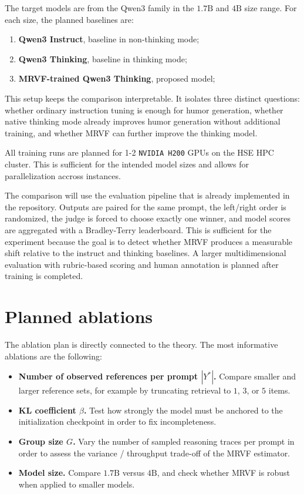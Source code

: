 The target models are from the Qwen3 family in the \(1.7\text{B}\) and \(4\text{B}\) size range. For each size, the planned baselines are:
\begin{enumerate}[leftmargin=1.8em]
    \item \textbf{Qwen3 Instruct}, baseline in non-thinking mode;
    \item \textbf{Qwen3 Thinking}, baseline in thinking mode;
    \item \textbf{MRVF-trained Qwen3 Thinking}, proposed model;
\end{enumerate}

This setup keeps the comparison interpretable. It isolates three distinct questions: whether ordinary instruction tuning is enough for humor generation, whether native thinking mode already improves humor generation without additional training, and whether MRVF can further improve the thinking model.

All training runs are planned for 1-2 \texttt{NVIDIA H200} GPUs on the HSE HPC cluster. This is sufficient for the intended model sizes and allows for parallelization accross instances.

The comparison will use the evaluation pipeline that is already implemented in the repository. Outputs are paired for the same prompt, the left/right order is randomized, the judge is forced to choose exactly one winner, and model scores are aggregated with a Bradley-Terry leaderboard. This is sufficient for the experiment because the goal is to detect whether MRVF produces a measurable shift relative to the instruct and thinking baselines. A larger multidimensional evaluation with rubric-based scoring and human annotation is planned after training is completed.

\section{Planned ablations}

The ablation plan is directly connected to the theory. The most informative ablations are the following:
\begin{itemize}[leftmargin=1.5em]
    \item \textbf{Number of observed references per prompt \(|Y^{*}|\).} Compare smaller and larger reference sets, for example by truncating retrieval to \(1\), \(3\), or \(5\) items.
    \item \textbf{KL coefficient \(\beta\).} Test how strongly the model must be anchored to the initialization checkpoint in order to fix incompleteness.
    \item \textbf{Group size \(G\).} Vary the number of sampled reasoning traces per prompt in order to assess the variance / throughput trade-off of the MRVF estimator.
    \item \textbf{Model size.} Compare \(1.7\text{B}\) versus \(4\text{B}\), and check whether MRVF is robust when applied to smaller models.
\end{itemize}
